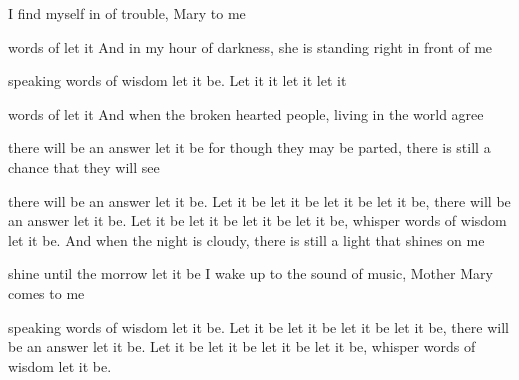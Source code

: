 

\zs
{} I find myself in  of trouble,
 Mary  to me

 words of  let it  
\ks
\zs
And in my hour of darkness,
she is standing right in front of me

speaking words of wisdom let it be.
\ks
\zr
Let it  it  let it  let it 

 words of  let it  
\kr
\zs
And when the broken hearted people,
living in the world agree

there will be an answer let it be
\ks
\zs
for though they may be parted,
there is still a chance that they will see

there will be an answer let it be.
\ks
\zr
Let it be let it be let it be let it be,
there will be an answer let it be.
\kr
\zr
Let it be let it be let it be let it be,
whisper words of wisdom let it be.
\kr
\zs
And when the night is cloudy,
there is still a light that shines on me

shine until the morrow let it be
\ks
\zs
I wake up to the sound of music,
Mother Mary comes to me

speaking words of wisdom let it be.
\ks
\zr
Let it be let it be let it be let it be,
there will be an answer let it be.
\kr
\zr
Let it be let it be let it be let it be,
whisper words of wisdom let it be.
\kr

\kp





